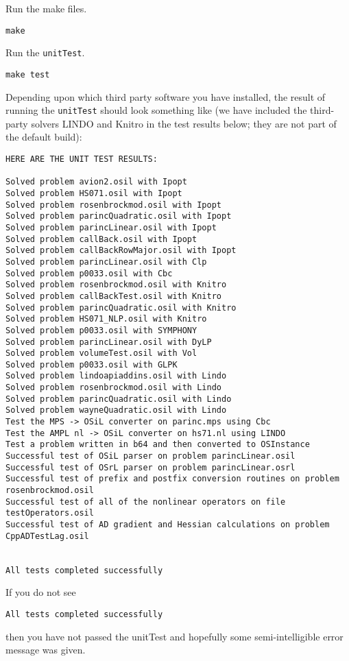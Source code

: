 \documentclass[11pt]{article}
\renewcommand{\_}{{\char"5F}}
\renewcommand{\{}{{\char"7B}}
\renewcommand{\}}{{\char"7D}}
\renewcommand{\^}{{\char"0D}}
\renewcommand{\'}{{\char"0D}}
\begin{document}
  Run the make files.

\begin{verbatim}
make
\end{verbatim}

 Run the {\tt unitTest}.

\begin{verbatim}
make test
\end{verbatim}

Depending upon which third party software you have installed, the result of running the {\tt unitTest} should look something like (we have included the third-party solvers LINDO and Knitro in the  test results below; they are not part of the default build):


{\small
\begin{verbatim}
HERE ARE THE UNIT TEST RESULTS:

Solved problem avion2.osil with Ipopt
Solved problem HS071.osil with Ipopt
Solved problem rosenbrockmod.osil with Ipopt
Solved problem parincQuadratic.osil with Ipopt
Solved problem parincLinear.osil with Ipopt
Solved problem callBack.osil with Ipopt
Solved problem callBackRowMajor.osil with Ipopt
Solved problem parincLinear.osil with Clp
Solved problem p0033.osil with Cbc
Solved problem rosenbrockmod.osil with Knitro
Solved problem callBackTest.osil with Knitro
Solved problem parincQuadratic.osil with Knitro
Solved problem HS071_NLP.osil with Knitro
Solved problem p0033.osil with SYMPHONY
Solved problem parincLinear.osil with DyLP
Solved problem volumeTest.osil with Vol
Solved problem p0033.osil with GLPK
Solved problem lindoapiaddins.osil with Lindo
Solved problem rosenbrockmod.osil with Lindo
Solved problem parincQuadratic.osil with Lindo
Solved problem wayneQuadratic.osil with Lindo
Test the MPS -> OSiL converter on parinc.mps using Cbc
Test the AMPL nl -> OSiL converter on hs71.nl using LINDO
Test a problem written in b64 and then converted to OSInstance
Successful test of OSiL parser on problem parincLinear.osil
Successful test of OSrL parser on problem parincLinear.osrl
Successful test of prefix and postfix conversion routines on problem rosenbrockmod.osil
Successful test of all of the nonlinear operators on file testOperators.osil
Successful test of AD gradient and Hessian calculations on problem CppADTestLag.osil


All tests completed successfully
\end{verbatim}
}

If you do not see
\begin{verbatim}
All tests completed successfully
\end{verbatim}
then you have not passed the unitTest and hopefully some semi-intelligible error message was given.
\end{document}

